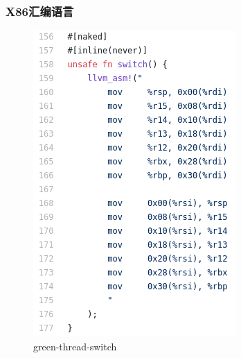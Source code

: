 \begin{frame}[fragile]
    \frametitle{X86汇编语言}
% 
	\begin{figure}
		\centering
		\includegraphics[width=0.5\linewidth]{figs/green-thread-switch.png}
		\caption{green-thread-switch}
	\end{figure}


% 
\end{frame}
